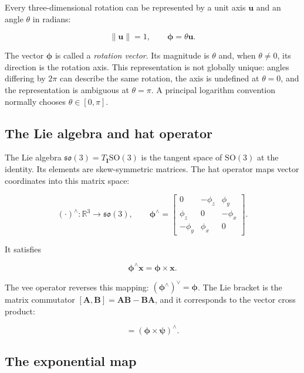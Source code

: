 \documentclass[10pt,a4paper]{article}
\numberwithin{equation}{section}
\newcommand{\Subsection}[1]{\subsection{#1}}
\newcommand{\SOthree}{\mathrm{SO}(3)}
\newcommand{\sothree}{\mathfrak{so}(3)}
\newcommand{\vect}[1]{\boldsymbol{#1}}
\theoremstyle{definition}
\theoremstyle{exercisestyle}
\begin{document}
Every three-dimensional rotation can be represented by a unit axis
$\mathbf{u}$ and an angle $\theta$ in radians:

\begin{equation}
    \|\mathbf{u}\|=1,
    \qquad
    \vect{\phi}=\theta\mathbf{u}.
    \label{eq:rotation-vector-definition}
\end{equation}

The vector $\vect{\phi}$ is called a \emph{rotation vector}. Its magnitude is
$\theta$ and, when $\theta\ne0$, its direction is the rotation axis. This
representation is not globally unique: angles differing by $2\pi$ can describe
the same rotation, the axis is undefined at $\theta=0$, and the representation
is ambiguous at $\theta=\pi$. A principal logarithm convention normally chooses
$\theta\in[0,\pi]$.

\Subsection{The Lie algebra and hat operator}

The Lie algebra $\sothree=T_{\mathbf{I}}\SOthree$ is the tangent space of
$\SOthree$ at the identity. Its elements are skew-symmetric matrices. The hat
operator maps vector coordinates into this matrix space:

\begin{equation}
    (\cdot)^\wedge:\mathbb{R}^3\rightarrow\sothree,
    \qquad
    \vect{\phi}^\wedge =
    \begin{bmatrix}
        0       & -\phi_z & \phi_y  \\
        \phi_z  & 0       & -\phi_x \\
        -\phi_y & \phi_x  & 0
    \end{bmatrix}.
    \label{eq:so3-hat}
\end{equation}

It satisfies

\begin{equation}
    \vect{\phi}^\wedge\mathbf{x}=\vect{\phi}\times\mathbf{x}.
\end{equation}

The vee operator reverses this mapping:
$\left(\vect{\phi}^\wedge\right)^\vee=\vect{\phi}$. The Lie bracket is the
matrix commutator $[\mathbf{A},\mathbf{B}]=\mathbf{A}\mathbf{B}-
    \mathbf{B}\mathbf{A}$, and it corresponds to the vector cross product:

\begin{equation}
    [\vect{\phi}^\wedge,\vect{\psi}^\wedge]
    =(\vect{\phi}\times\vect{\psi})^\wedge.
\end{equation}

\Subsection{The exponential map}
\end{document}
